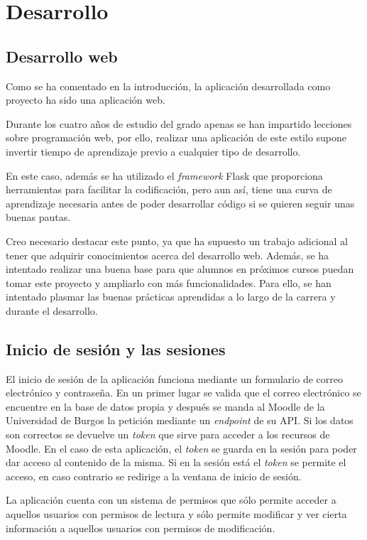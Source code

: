 \section{Desarrollo}
\subsection{Desarrollo web}
Como se ha comentado en la introducción, la aplicación desarrollada como proyecto ha sido una aplicación web.

Durante los cuatro años de estudio del grado apenas se han impartido lecciones sobre programación web, por ello, realizar una aplicación de este estilo supone invertir tiempo de aprendizaje previo a cualquier tipo de desarrollo.

En este caso, además se ha utilizado el \textit{framework} Flask que proporciona herramientas para facilitar la codificación, pero aun así, tiene una curva de aprendizaje necesaria antes de poder desarrollar código si se quieren seguir unas buenas pautas.

Creo necesario destacar este punto, ya que ha supuesto un trabajo adicional al tener que adquirir conocimientos acerca del desarrollo web.
Además, se ha intentado realizar una buena base para que alumnos en próximos cursos puedan tomar este proyecto y ampliarlo con más funcionalidades.
Para ello, se han intentado plasmar las buenas prácticas aprendidas a lo largo de la carrera y durante el desarrollo.

\subsection{Inicio de sesión y las sesiones}
El inicio de sesión de la aplicación funciona mediante un formulario de correo electrónico y contraseña.
En un primer lugar se valida que el correo electrónico se encuentre en la base de datos propia y después se manda al Moodle de la Universidad de Burgos la petición mediante un \textit{endpoint} de su API. 
Si los datos son correctos se devuelve un \textit{token} que sirve para acceder a los recursos de Moodle.
En el caso de esta aplicación, el \textit{token} se guarda en la sesión para poder dar acceso al contenido de la misma.
Si en la sesión está el \textit{token} se permite el acceso, en caso contrario se redirige a la ventana de inicio de sesión.

La aplicación cuenta con un sistema de permisos que sólo permite acceder a aquellos usuarios con permisos de lectura y sólo permite modificar y ver cierta información a aquellos usuarios con permisos de modificación.

